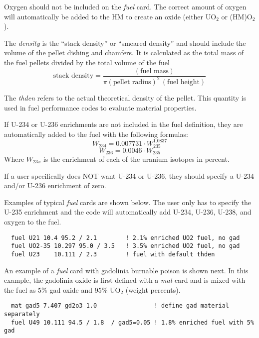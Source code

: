 Oxygen should not be included on the {\it fuel} card.  The correct amount of oxygen will automatically
be added to the HM to create an oxide (either UO$_2$  or (HM)O$_2$).

The {\it density} is the ``stack density'' or ``smeared density'' and should include the volume
of the pellet dishing and chamfers.
It is calculated as the total mass of the fuel pellets divided by the total volume of the fuel
\begin{equation}
  \mbox{stack density} = \frac{ (\mbox{fuel mass})} { \pi (\mbox{pellet radius})^2 \, (\mbox{fuel height}) }
\end{equation}

The {\it thden} refers to the actual theoretical density of the pellet.  This quantity is
used in fuel performance codes to evaluate material properties.

If U-234 or U-236 enrichments are not included in the fuel definition, they are automatically
added to the fuel with the following formulas:
\begin{equation}
   W_{234} = 0.007731 \cdot W_{235}^{1.0837}
\end{equation}
\begin{equation}
  W_{236} = 0.0046 \cdot W_{235}
\end{equation}
Where $W_{23x}$ is the enrichment of each of the uranium isotopes in percent.

If a user specifically does NOT want U-234 or U-236, they should specify a U-234 
and/or U-236 enrichment of zero.

Examples of typical {\it fuel} cards are shown below.  The user
only has to specify the U-235 enrichment and the code will automatically add
U-234, U-236, U-238, and oxygen to the fuel.
\begin{verbatim}
  fuel U21 10.4 95.2 / 2.1        ! 2.1% enriched UO2 fuel, no gad
  fuel UO2-35 10.297 95.0 / 3.5   ! 3.5% enriched UO2 fuel, no gad
  fuel U23    10.111 / 2.3        ! fuel with default thden
\end{verbatim}

An example of a {\it fuel} card with gadolinia burnable poison is shown next.
In this example, the gadolinia oxide is first defined with a {\it mat} card and 
is mixed with the fuel as 5\%  gad oxide and 95\% UO$_2$ (weight percents). 
\begin{verbatim}
  mat gad5 7.407 gd2o3 1.0                ! define gad material separately
  fuel U49 10.111 94.5 / 1.8  / gad5=0.05 ! 1.8% enriched fuel with 5% gad
\end{verbatim}

